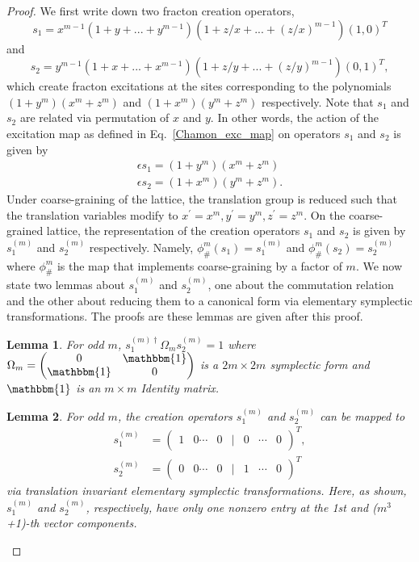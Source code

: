 \documentclass[prx,twocolumn,superscriptaddress,nofootinbib,showpacs,notitlepage]{revtex4-2}
\newtheorem{lemma}{Lemma}[section]
\begin{document}
\begin{proof}
We first write down two fracton creation operators,
$$s_1=x^{m-1}(1+y+...+y^{m-1})(1+z/x+...+(z/x)^{m-1})(1,0)^T$$
and
$$s_2=y^{m-1}(1+x+...+x^{m-1})(1+z/y+...+(z/y)^{m-1})(0,1)^T,$$
which create fracton excitations at the sites corresponding to the polynomials
$(1+y^m)(x^m+z^m)$ and $(1+x^m)(y^m+z^m)$ respectively. Note that $s_1$ and $s_2$ are related via permutation of $x$ and $y$. In other words, the action of the excitation map as defined in Eq.~\ref{Chamon_exc_map} on operators $s_1$ and $s_2$ is given by
\begin{align*}
 \epsilon s_1=(1+y^m)(x^m+z^m)\\
 \epsilon s_2=(1+x^m)(y^m+z^m). 
\end{align*}
Under coarse-graining of the lattice, the translation group is reduced such that the translation variables modify to $x^\prime=x^m,y^\prime=y^m,z^\prime=z^m$. On the coarse-grained lattice, the representation of the creation operators $s_1$ and $s_2$ is given by $s_1^{(m)}$ and $s_2^{(m)}$ respectively. Namely, $\phi^m_{\#}(s_1)=s_1^{(m)}$ and $\phi^m_{\#}(s_2)=s_2^{(m)}$ where $\phi^m_{\#}$ is the map that implements coarse-graining by a factor of $m$.   
We now state two lemmas about $s_1^{(m)}$ and $s_2^{(m)}$, one about the commutation relation and the other about reducing them to a canonical form via elementary symplectic transformations. The proofs are these lemmas are given after this proof.

\begin{lemma}
\label{lem:s1s2com}
For odd $m$, $s_1^{(m)\dagger}\Omega_ms_2^{(m)}=1$ where $\Omega_m=\begin{pmatrix}
0 & \mathbbm{1} \\
\mathbbm{1} & 0 
\end{pmatrix}$ is a $2m\times 2m$ symplectic form and $\mathbbm{1}$ is an $m\times m$ Identity matrix. 
\end{lemma}



\begin{lemma}
\label{lem:s1s2canonical}
For odd $m$, the creation operators $s_1^{(m)}$ and $s_2^{(m)}$ can be mapped to
\begin{align}
s_1^{(m)} &= \begin{pmatrix} 1 & 0 \cdots & 0 &| & 0 &\cdots & 0\end{pmatrix}^T, \nonumber\\
s_2^{(m)} &= \begin{pmatrix} 0 & 0\cdots &0 &| & 1 & \cdots & 0 \end{pmatrix}^T
\end{align}
via translation invariant elementary symplectic transformations. Here, as shown, $s_1^{(m)}$ and $s_2^{(m)}$, respectively, have only one nonzero entry at the 1st and ($m^3$+1)-th vector components. 
\end{lemma}




\end{proof}
\end{document}
